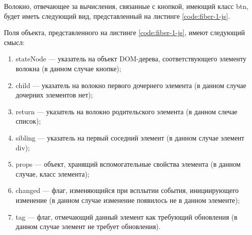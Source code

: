 Волокно, отвечающее за вычисления, связанные с кнопкой, имеющий класс btn, будет иметь следующий вид, представленный на листинге \ref{code:fiber-1-js}.


Поля объекта, представленного на листинге \ref{code:fiber-1-js}, имеют следующий смысл:
\begin{enumerate}[label=\arabic*)]
	\item stateNode --- указатель на объект DOM-дерева, соответствующего элементу волокна (в данном случае кнопке);
	\item child --- указатель на волокно первого дочернего элемента (в данном случае дочерних элементов нет);
	\item return --- указатель на волокно родительского элемента (в данном слечае список);
	\item sibling --- указатель на первый соседний элемент (в данном случае элемент div);
	\item props --- объект, хранящий вспомогательные свойства элемента (в данном случае, класс элемента);
	\item changed --- флаг, изменяющийся при всплытии события, инициирующего изменение (в данном случае изменение появилось не в данном элементе);
	\item tag --- флаг, отмечающий данный элемент как требующий обновления (в данном случае элемент не требует обновления).
\end{enumerate}

